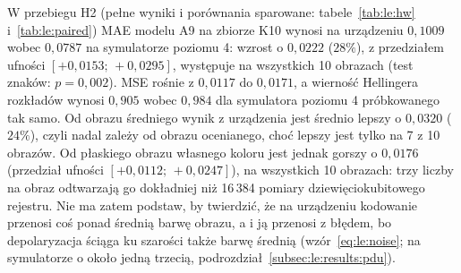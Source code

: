 W przebiegu H2 (pełne wyniki i porównania sparowane: tabele~\ref{tab:le:hw} i~\ref{tab:le:paired}) MAE modelu A9 na zbiorze K10 wynosi na urządzeniu $0{,}1009$ wobec $0{,}0787$ na symulatorze poziomu 4: wzrost o $0{,}0222$ ($28\%$), z przedziałem ufności $[+0{,}0153;\,+0{,}0295]$, występuje na wszystkich 10 obrazach (test znaków: $p=0{,}002$).
MSE rośnie z $0{,}0117$ do $0{,}0171$, a wierność Hellingera rozkładów wynosi $0{,}905$ wobec $0{,}984$ dla symulatora poziomu 4 próbkowanego tak samo.
Od obrazu średniego wynik z urządzenia jest średnio lepszy o $0{,}0320$ ($24\%$), czyli nadal zależy od obrazu ocenianego, choć lepszy jest tylko na 7 z 10 obrazów.
Od płaskiego obrazu własnego koloru jest jednak gorszy o $0{,}0176$ (przedział ufności $[+0{,}0112;\,+0{,}0247]$), na wszystkich 10 obrazach: trzy liczby na obraz odtwarzają go dokładniej niż 16\,384 pomiary dziewięciokubitowego rejestru.
Nie ma zatem podstaw, by twierdzić, że na urządzeniu kodowanie przenosi coś ponad średnią barwę obrazu, a i ją przenosi z błędem, bo depolaryzacja ściąga ku szarości także barwę średnią (wzór~\eqref{eq:le:noise}; na symulatorze o około jedną trzecią, podrozdział~\ref{subsec:le:results:pdu}).

